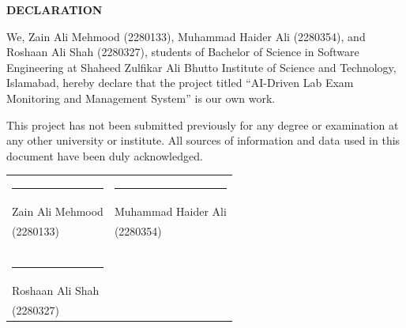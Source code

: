 \newpage
\begin{center}
    \textbf{\Huge \textbf{DECLARATION}}
\end{center}
\vspace{1cm}

\begin{onehalfspacing}
We, Zain Ali Mehmood (2280133), Muhammad Haider Ali (2280354), and Roshaan Ali Shah (2280327), students of Bachelor of Science in Software Engineering at Shaheed Zulfikar Ali Bhutto Institute of Science and Technology, Islamabad, hereby declare that the project titled ``AI-Driven Lab Exam Monitoring and Management System'' is our own work.

This project has not been submitted previously for any degree or examination at any other university or institute. All sources of information and data used in this document have been duly acknowledged.
\end{onehalfspacing}

\vspace{2cm}

\begin{table}[h!]
\centering
\begin{tabular}{p{7.5cm} p{7.5cm}}
\rule{6cm}{0.4pt} & \rule{6cm}{0.4pt} \\
Zain Ali Mehmood & Muhammad Haider Ali \\
(2280133) & (2280354) \\
& \\
& \\
& \\
\rule{6cm}{0.4pt} & \\
Roshaan Ali Shah & \\
(2280327) & \\
\end{tabular}
\end{table}
